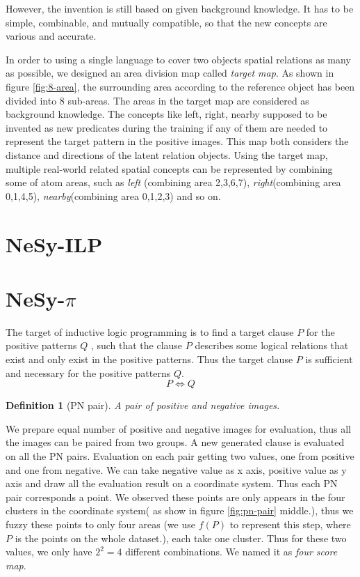 \documentclass[
]{ceurart}
\newtheorem{definition}{Definition}[section]
\begin{document}
However, the invention is still based on given background knowledge. It has to be simple, combinable,  and mutually compatible, so that the new concepts are various and accurate.

In order to using a single language to cover two objects spatial relations as many as possible, we designed an area division map called \textit{target map}. As shown in figure \ref{fig:8-area}, the surrounding area according to the reference object has been divided into 8 sub-areas. 
The areas in the target map are considered as background knowledge. The concepts like left, right, nearby supposed to be invented as new predicates during the training if any of them are needed to represent the target pattern in the positive images.  This map both considers the distance and directions of the latent relation objects. 
Using the target map, multiple real-world related spatial concepts can be represented by combining some of atom areas, such as 
\textit{left} (combining area 2,3,6,7), 
\textit{right}(combining area 0,1,4,5), 
\textit{nearby}(combining area 0,1,2,3) and so on. 

\newpage

\section{NeSy-ILP}


\section{NeSy-$ \pi $}

The target of inductive logic programming is to find a target clause $ P $ for the positive patterns $ Q $ , such that the clause $ P $ describes some logical relations that exist and only exist in the positive patterns. 
Thus the target clause $ P $ is sufficient and necessary for the positive patterns $ Q $.
\[ P\Leftrightarrow Q \]


\begin{definition}[PN pair]
	A pair of positive and negative images.
\end{definition}
We prepare equal number of positive and negative images for evaluation, thus all the images can be paired from two groups.
A new generated clause is evaluated on all the PN pairs. Evaluation on each pair getting two values, one from positive and one from negative. 
 We can take negative value as x axis, positive value as y axis and draw all the evaluation result on a coordinate system. Thus each PN pair corresponds a point. We observed these points are only appears in the four clusters in the coordinate system( as show in figure \ref{fig:pn-pair} middle.), thus we fuzzy these points to only four areas (we use $ f(P) $ to represent this step, where $ P $ is the points on the whole dataset.), each take one cluster. Thus for these two values, we only have $ 2^2=4 $ different combinations. We named it as \textit{four score map}.  
 
\end{document}
